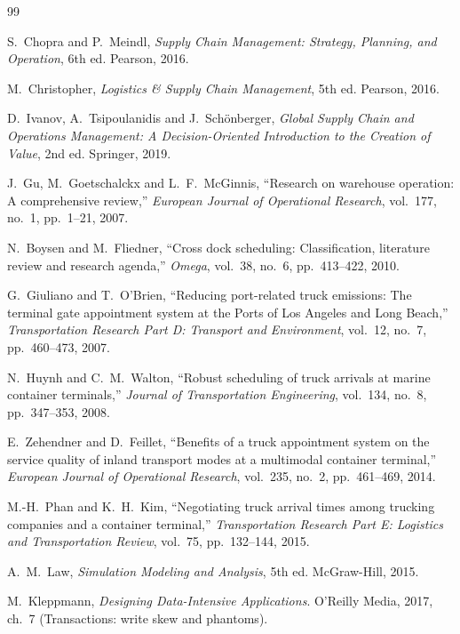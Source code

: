 \begin{thebibliography}{99}

 S.~Chopra and P.~Meindl, \emph{Supply Chain Management: Strategy, Planning, and Operation}, 6th ed. Pearson, 2016.

 M.~Christopher, \emph{Logistics \& Supply Chain Management}, 5th ed. Pearson, 2016.

 D.~Ivanov, A.~Tsipoulanidis and J.~Schönberger, \emph{Global Supply Chain and Operations Management: A Decision-Oriented Introduction to the Creation of Value}, 2nd ed. Springer, 2019.

 J.~Gu, M.~Goetschalckx and L.~F.~McGinnis, ``Research on warehouse operation: A comprehensive review,'' \emph{European Journal of Operational Research}, vol.~177, no.~1, pp.~1--21, 2007.

 N.~Boysen and M.~Fliedner, ``Cross dock scheduling: Classification, literature review and research agenda,'' \emph{Omega}, vol.~38, no.~6, pp.~413--422, 2010.

 G.~Giuliano and T.~O'Brien, ``Reducing port-related truck emissions: The terminal gate appointment system at the Ports of Los Angeles and Long Beach,'' \emph{Transportation Research Part D: Transport and Environment}, vol.~12, no.~7, pp.~460--473, 2007.

 N.~Huynh and C.~M.~Walton, ``Robust scheduling of truck arrivals at marine container terminals,'' \emph{Journal of Transportation Engineering}, vol.~134, no.~8, pp.~347--353, 2008.

 E.~Zehendner and D.~Feillet, ``Benefits of a truck appointment system on the service quality of inland transport modes at a multimodal container terminal,'' \emph{European Journal of Operational Research}, vol.~235, no.~2, pp.~461--469, 2014.

 M.-H.~Phan and K.~H.~Kim, ``Negotiating truck arrival times among trucking companies and a container terminal,'' \emph{Transportation Research Part E: Logistics and Transportation Review}, vol.~75, pp.~132--144, 2015.

 A.~M.~Law, \emph{Simulation Modeling and Analysis}, 5th ed. McGraw-Hill, 2015.

 M.~Kleppmann, \emph{Designing Data-Intensive Applications}. O'Reilly Media, 2017, ch.~7 (Transactions: write skew and phantoms).


\end{thebibliography}
